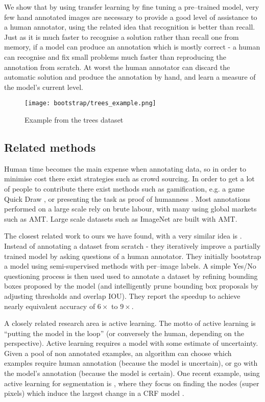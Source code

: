 We show that by using transfer learning by fine tuning a pre--trained model, very few hand annotated images are necessary to provide a good level of assistance to a human annotator, using the related idea that recognition is better than recall. Just as it is much faster to recognise a solution rather than recall one from memory, if a model can produce an annotation which is mostly correct - a human can recognise and fix small problems much faster than reproducing the annotation from scratch. At worst the human annotator can discard the automatic solution and produce the annotation by hand, and learn a measure of the model's current level.

\begin{figure}[ht]
\centering
\texttt{[image: bootstrap/trees\_example.png]}

\caption{Example from the trees dataset}
\label{fig:bootstrap_tree}
\end{figure}

\subsection{Related methods}


Human time becomes the main expense when annotating data, so in order to minimise cost there exist strategies such as crowd sourcing. In order to get a lot of people to contribute there exist methods such as gamification, e.g. a game Quick Draw \cite{Ha2017}, or presenting the task as proof of humanness \cite{Goodfellow2013a}.  Most annotations performed on a large scale rely on brute labour, with many using global markets such as \gls{AMT}. Large scale datasets such as ImageNet \cite{Russakovsky2015} are built with \gls{AMT}. 

The closest related work to ours we have found, with a very similar idea is \cite{Papadopoulos2016}. Instead of annotating a dataset from scratch - they iteratively improve a partially trained model by asking questions of a human annotator. They initially bootstrap a model using semi-supervised methods with per--image labels. A simple Yes/No questioning process is then used used to annotate a dataset by refining bounding boxes proposed by the model (and intelligently prune bounding box proposals by adjusting thresholds and overlap \gls{IOU}). They report the speedup to achieve nearly equivalent accuracy of $6\times$ to $9\times$.

A closely related research area is active learning. The motto of active learning is ``putting the model in the loop'' (or conversely the human, depending on the perspective). Active learning requires a model with some estimate of uncertainty. Given a pool of non annotated examples, an algorithm can choose which examples require human annotation (because the model is uncertain), or go with the model's annotation (because the model is certain). One recent example, using active learning for segmentation is \cite{Xu2017}, where they focus on finding the nodes (super pixels) which induce the largest change in a \gls{CRF} model .

